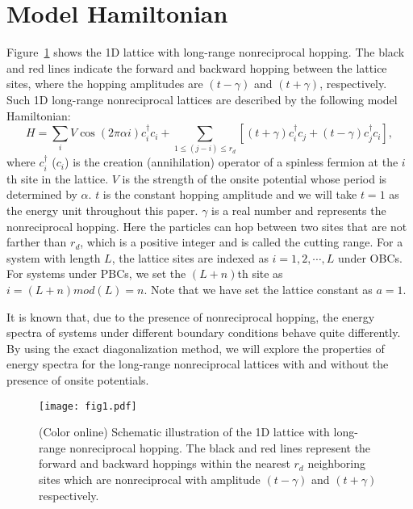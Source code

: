 \documentclass[prb,aps,twocolumn,showpacs]{revtex4-2} %
\begin{document}
\section{Model Hamiltonian}\label{sect2}
Figure~\ref{fig1} shows the 1D lattice with long-range nonreciprocal hopping. The black and red lines indicate the forward and backward hopping between the lattice sites, where the hopping amplitudes are $(t-\gamma)$ and $(t+\gamma)$, respectively. Such 1D long-range nonreciprocal lattices are described by the following model Hamiltonian:
\begin{equation}\label{H}
H = \sum_i V \cos (2\pi \alpha i) c_i^\dagger c_i + \sum_{1 \leq (j-i) \leq r_d} [ (t+\gamma) c_i^\dagger c_j + (t-\gamma) c_j^\dagger c_i ],
\end{equation}
where $c_i^\dagger$ ($c_i$) is the creation (annihilation) operator of a spinless fermion at the $i$th site in the lattice. $V$ is the strength of the onsite potential whose period is determined by $\alpha$. $t$ is the constant hopping amplitude and we will take $t=1$ as the energy unit throughout this paper. $\gamma$ is a real number and represents the nonreciprocal hopping. Here the particles can hop between two sites that are not farther than $r_d$, which is a positive integer and is called the cutting range. For a system with length $L$, the lattice sites are indexed as $i=1,2,\cdots,L$ under OBCs. For systems under PBCs, we set the $(L+n)$th site as $i=(L+n)mod(L)=n$. Note that we have set the lattice constant as $a=1$. 

It is known that, due to the presence of nonreciprocal hopping, the energy spectra of systems under different boundary conditions behave quite differently. By using the exact diagonalization method, we will explore the properties of energy spectra for the long-range nonreciprocal lattices with and without the presence of onsite potentials.

\begin{figure}[t]
  \texttt{[image: fig1.pdf]}
  \caption{(Color online) Schematic illustration of the 1D lattice with long-range nonreciprocal hopping. The black and red lines represent the forward and backward hoppings within the nearest $r_d$ neighboring sites which are nonreciprocal with amplitude $(t-\gamma)$ and $(t+\gamma)$ respectively.}
\label{fig1}
\end{figure}
\end{document}

